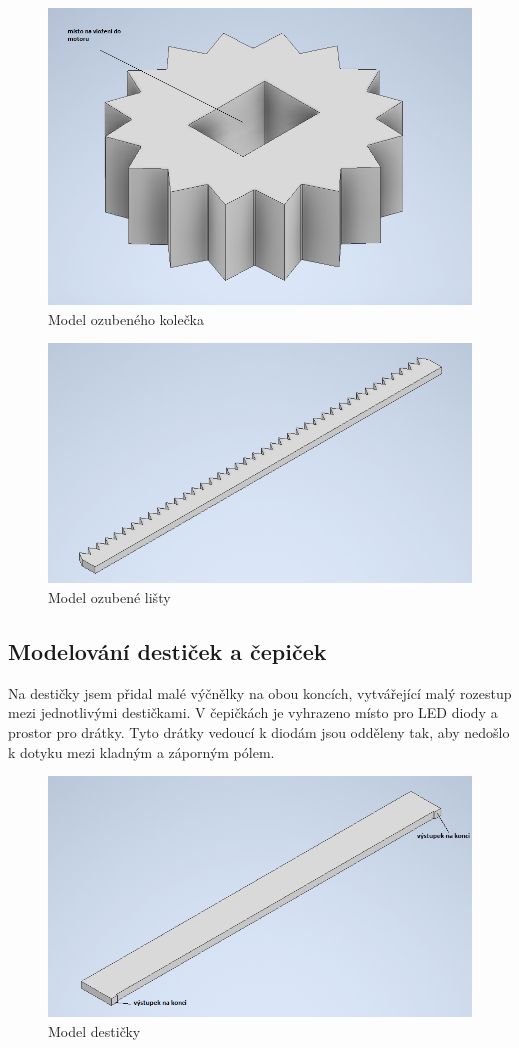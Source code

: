\documentclass[12pt, a4paper, twoside]{report}
\begin{document}
	\begin{figure}[h]
		\centering
		\includegraphics[width=0.7\linewidth]{image/ozubene-kolecko.png}
		\caption{Model ozubeného kolečka}
		\label{fig:ozubenekoleckoobr}
	\end{figure}
	
	\begin{figure}[h]
		\centering
		\includegraphics[width=0.7\linewidth]{image/ozubena-lista.png}
		\caption{Model ozubené lišty}
		\label{fig:ozubenalistaobr}
	\end{figure}
	
	\newpage
	
	\subsection{Modelování destiček a čepiček}
	
	\noindent Na destičky jsem přidal malé výčnělky na obou koncích, vytvářející malý rozestup mezi jednotlivými destičkami. V čepičkách je vyhrazeno místo pro LED diody a prostor pro drátky. Tyto drátky vedoucí k diodám jsou odděleny tak, aby nedošlo k dotyku mezi kladným a záporným pólem. \\
	
	\begin{figure}[h]
		\centering
		\includegraphics[width=0.7\linewidth]{image/desticka.png} 
		\caption{Model destičky}
		\label{fig:destickaobr}
	\end{figure}
\end{document}
